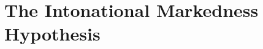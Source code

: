 \documentclass[fleqn,reqno,10pt,draft]{article}
\newcommand{\lit}{\acro{lit}}
\newcommand{\glb}{\acro{glb}}
\newcommand{\loc}{\acro{loc}}
\newcommand{\as}{\acro{as}}
\renewcommand{\es}{\acro{es}}
\begin{document}

\section{The Intonational Markedness Hypothesis}
\label{sec:inton-mark-hypoth}
\end{document}
